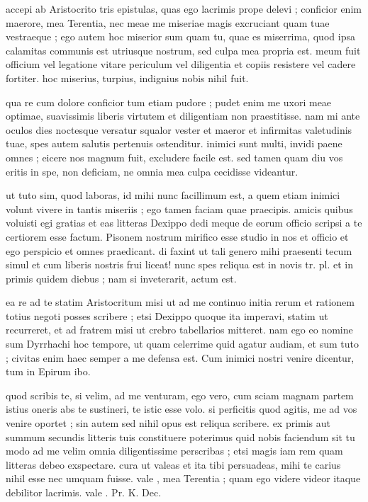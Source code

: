 


 accepi ab Aristocrito tris epistulas, quas ego lacrimis prope delevi ; conficior enim maerore, mea Terentia, nec meae me miseriae magis excruciant quam tuae vestraeque ; ego autem hoc miserior sum quam tu, quae es miserrima, quod ipsa calamitas communis est utriusque nostrum, sed culpa mea propria est. meum fuit officium vel legatione vitare periculum vel diligentia et copiis resistere vel cadere fortiter. hoc miserius, turpius, indignius nobis nihil fuit.

 qua re cum dolore conficior tum etiam pudore ; pudet enim me uxori meae optimae, suavissimis liberis virtutem et diligentiam non praestitisse. nam mi ante oculos dies noctesque versatur squalor vester et maeror et infirmitas valetudinis tuae, spes autem salutis pertenuis ostenditur. inimici sunt multi, invidi paene omnes ; eicere nos magnum fuit, excludere facile est. sed tamen quam diu vos eritis in spe, non deficiam, ne omnia mea culpa cecidisse videantur.

 ut tuto sim, quod laboras, id mihi nunc facillimum est, a quem etiam inimici volunt vivere in tantis miseriis ; ego tamen faciam quae praecipis. amicis quibus voluisti egi gratias et eas litteras Dexippo dedi meque de eorum officio scripsi a te certiorem esse factum. Pisonem nostrum mirifico esse studio in nos et officio et ego perspicio et omnes praedicant. di faxint ut tali genero mihi praesenti tecum simul et cum liberis nostris frui liceat! nunc spes reliqua est in novis tr. pl. et in primis quidem diebus ; nam si inveterarit, actum est.

 ea re ad te statim Aristocritum misi ut ad me continuo initia rerum et rationem totius negoti posses scribere ; etsi Dexippo quoque ita imperavi, statim ut recurreret, et ad fratrem misi ut crebro tabellarios mitteret. nam ego eo nomine sum Dyrrhachi hoc tempore, ut quam celerrime quid agatur audiam, et sum tuto ; civitas enim haec semper a me defensa est. Cum inimici nostri venire dicentur, tum in Epirum ibo.

 quod scribis te, si velim, ad me venturam, ego vero, cum sciam magnam partem istius oneris abs te sustineri, te istic esse volo. si perficitis quod agitis, me ad vos venire oportet ; sin autem sed nihil opus est reliqua scribere. ex primis aut summum secundis litteris tuis constituere poterimus quid nobis faciendum sit tu modo ad me velim omnia diligentissime perscribas ; etsi magis iam rem quam litteras debeo exspectare. cura ut valeas et ita tibi persuadeas, mihi te carius nihil esse nec umquam fuisse. vale , mea Terentia ; quam ego videre videor itaque debilitor lacrimis. vale . Pr. K. Dec.
